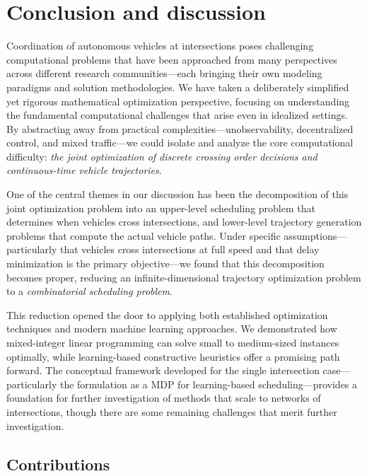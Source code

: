 \documentclass{report}
\theoremstyle{definition}
\theoremstyle{plain}
\begin{document}
\chapter{Conclusion and discussion}\label{chap:conclusion}

Coordination of autonomous vehicles at intersections poses challenging
computational problems that have been approached from many perspectives across
different research communities---each bringing their own modeling paradigms and
solution methodologies.
%
We have taken a deliberately simplified yet rigorous mathematical optimization
perspective, focusing on understanding the fundamental computational challenges
that arise even in idealized settings.
%
By abstracting away from practical complexities---unobservability, decentralized
control, and mixed traffic---we could isolate and analyze the core computational
difficulty: \emph{the joint optimization of discrete crossing order decisions and continuous-time vehicle
  trajectories}.

One of the central themes in our discussion has been the decomposition of this
joint optimization problem into an upper-level scheduling problem that
determines when vehicles cross intersections, and lower-level trajectory
generation problems that compute the actual vehicle paths.
%
Under specific assumptions---particularly that vehicles cross intersections at
full speed and that delay minimization is the primary objective---we found that
this decomposition becomes proper, reducing an infinite-dimensional trajectory
optimization problem to a \emph{combinatorial scheduling problem}.

This reduction opened the door to applying both established optimization
techniques and modern machine learning approaches.
%
We demonstrated how mixed-integer linear programming can solve small to
medium-sized instances optimally, while learning-based constructive heuristics
offer a promising path forward.
%
The conceptual framework developed for the single intersection
case---particularly the formulation as a MDP for learning-based
scheduling---provides a foundation for further investigation of methods that
scale to networks of intersections, though there are some remaining challenges
that merit further investigation.

\section{Contributions}
\end{document}
